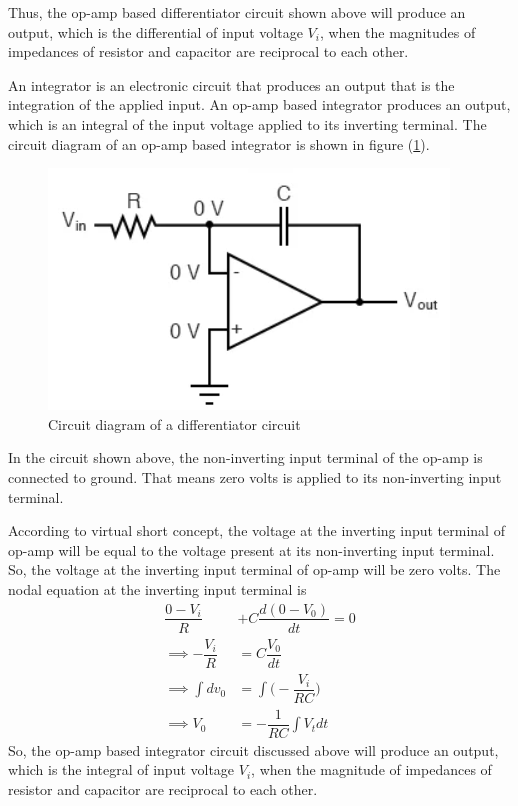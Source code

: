 \documentclass[%
 aip,
 amsmath,amssymb,
 reprint, floatfix%
]{revtex4-2}
\begin{document}
        Thus, the op-amp based differentiator circuit shown above will produce an output, which is the differential of input voltage $V_i$, when the magnitudes of impedances of resistor and capacitor are reciprocal to each other.
        \par
        An integrator is an electronic circuit that produces an output that is the integration of the applied input. An op-amp based integrator produces an output, which is an integral of the input voltage applied to its inverting terminal. The circuit diagram of an op-amp based integrator is shown in figure (\ref{fig:int}).
        \begin{figure}
            \centering
            \includegraphics{Figures/integrator.png}
            \caption{Circuit diagram of a differentiator circuit}
            \label{fig:int}
        \end{figure}
        In the circuit shown above, the non-inverting input terminal of the op-amp is connected to ground. That means zero volts is applied to its non-inverting input terminal.
        \par
        According to virtual short concept, the voltage at the inverting input terminal of op-amp will be equal to the voltage present at its non-inverting input terminal. So, the voltage at the inverting input terminal of op-amp will be zero volts. The nodal equation at the inverting input terminal is
        \begin{equation}
            \begin{split}
                \dfrac{0-V_i}{R} &+ C \dfrac{d(0-V_0)}{dt} = 0 \\
                \implies -\dfrac{V_i}{R} &= C \dfrac{V_0}{dt} \\
                \implies \int dv_0 &= \int \Bigg( -\dfrac{V_i}{RC} \Bigg) \\
                \implies V_0 &= - \dfrac{1}{RC} \int V_t dt
            \end{split}
        \end{equation}
        So, the op-amp based integrator circuit discussed above will produce an output, which is the integral of input voltage $V_i$, when the magnitude of impedances of resistor and capacitor are reciprocal to each other.
\end{document}
